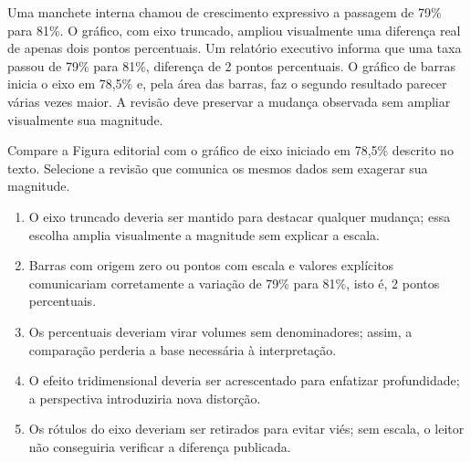 \TextoBase

Uma manchete interna chamou de crescimento expressivo a passagem de 79\% para 81\%. O gráfico, com eixo truncado, ampliou visualmente uma diferença real de apenas dois pontos percentuais.
 Um relatório executivo informa que uma taxa passou de 79\% para 81\%, diferença de 2 pontos percentuais. O gráfico de barras inicia o eixo em 78,5\% e, pela área das barras, faz o segundo resultado parecer várias vezes maior. A revisão deve preservar a mudança observada sem ampliar visualmente sua magnitude.

\begin{DocumentBox}
\centering
{}
\end{DocumentBox}

\FonteDidatica
\Comando Compare a Figura editorial com o gráfico de eixo iniciado em 78,5\% descrito no texto. Selecione a revisão que comunica os mesmos dados sem exagerar sua magnitude.

\begin{enumerate}[label=\Alph*)]
  \item O eixo truncado deveria ser mantido para destacar qualquer mudança; essa escolha amplia visualmente a magnitude sem explicar a escala.
  \item Barras com origem zero ou pontos com escala e valores explícitos comunicariam corretamente a variação de 79\% para 81\%, isto é, 2 pontos percentuais.
  \item Os percentuais deveriam virar volumes sem denominadores; assim, a comparação perderia a base necessária à interpretação.
  \item O efeito tridimensional deveria ser acrescentado para enfatizar profundidade; a perspectiva introduziria nova distorção.
  \item Os rótulos do eixo deveriam ser retirados para evitar viés; sem escala, o leitor não conseguiria verificar a diferença publicada.
\end{enumerate}

